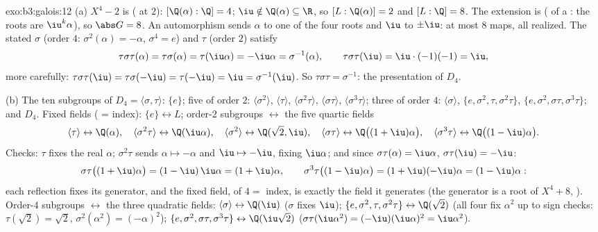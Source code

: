 \begin{solution}{exo:b3:galois:12}
(a) $X^4 - 2$ is  ( at $2$):
$[\Q(\alpha):\Q] = 4$; $\iu \notin \Q(\alpha) \subseteq \R$,
so $[L : \Q(\alpha)] = 2$ and $[L:\Q] = 8$. The extension is
 ( of a : the roots
are $\iu^k\alpha$), so $\abs G = 8$. An automorphism sends
$\alpha$ to one of the four roots and $\iu$ to $\pm\iu$:
at most $8$ maps, all realized. The stated $\sigma$ (order
$4$: $\sigma^2(\alpha) = -\alpha$, $\sigma^4 = e$) and $\tau$
(order $2$) satisfy
\[
\tau\sigma\tau(\alpha) = \tau\sigma(\alpha) =
\tau(\iu\alpha) = -\iu\alpha = \sigma^{-1}(\alpha),
\qquad \tau\sigma\tau(\iu) = \iu\cdot(-1)(-1) = \iu ,
\]
more carefully: $\tau\sigma\tau(\iu) = \tau\sigma(-\iu) =
\tau(-\iu) = \iu = \sigma^{-1}(\iu)$. So $\tau\sigma\tau =
\sigma^{-1}$: the presentation of $D_4$.

(b) The ten subgroups of $D_4 = \langle\sigma,
\tau\rangle$: $\{e\}$; five of order $2$:
$\langle\sigma^2\rangle$, $\langle\tau\rangle$,
$\langle\sigma^2\tau\rangle$, $\langle\sigma\tau\rangle$,
$\langle\sigma^3\tau\rangle$; three of order $4$:
$\langle\sigma\rangle$, $\{e, \sigma^2, \tau,
\sigma^2\tau\}$, $\{e, \sigma^2, \sigma\tau,
\sigma^3\tau\}$; and $D_4$. Fixed fields ( = index):
$\{e\} \leftrightarrow L$; order-$2$ subgroups
$\leftrightarrow$ the five quartic fields
\[
\langle\tau\rangle \leftrightarrow \Q(\alpha),\quad
\langle\sigma^2\tau\rangle \leftrightarrow \Q(\iu\alpha),
\quad
\langle\sigma^2\rangle \leftrightarrow \Q(\sqrt2, \iu),\quad
\langle\sigma\tau\rangle \leftrightarrow
\Q\bigl((1+\iu)\alpha\bigr),\quad
\langle\sigma^3\tau\rangle \leftrightarrow
\Q\bigl((1-\iu)\alpha\bigr) .
\]
Checks: $\tau$ fixes the real $\alpha$; $\sigma^2\tau$ sends
$\alpha \mapsto -\alpha$ and $\iu \mapsto -\iu$, fixing
$\iu\alpha$; and since $\sigma\tau(\alpha) = \iu\alpha$,
$\sigma\tau(\iu) = -\iu$:
\[
\sigma\tau\bigl((1+\iu)\alpha\bigr) =
(1 - \iu)\,\iu\alpha = (1 + \iu)\alpha,
\qquad
\sigma^3\tau\bigl((1-\iu)\alpha\bigr) =
(1 + \iu)(-\iu)\alpha = (1 - \iu)\alpha :
\]
each reflection fixes its generator, and the fixed field,
of  $4 = $ index, is exactly the field it generates
(the generator is a root of $X^4 + 8$, ). Order-$4$ subgroups
$\leftrightarrow$ the three quadratic fields:
$\langle\sigma\rangle \leftrightarrow \Q(\iu)$ ($\sigma$
fixes $\iu$); $\{e, \sigma^2, \tau, \sigma^2\tau\}
\leftrightarrow \Q(\sqrt2)$ (all four fix $\alpha^2$ up to
sign checks: $\tau(\sqrt2) = \sqrt2$, $\sigma^2(\alpha^2) =
(-\alpha)^2$); $\{e, \sigma^2, \sigma\tau, \sigma^3\tau\}
\leftrightarrow \Q(\iu\sqrt2)$ ($\sigma\tau(\iu\alpha^2) =
(-\iu)(\iu\alpha)^2 = \iu\alpha^2$).


\end{solution}
